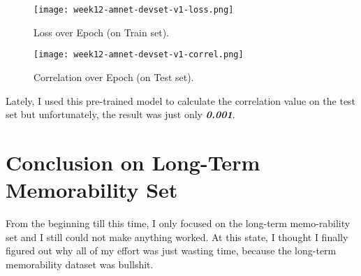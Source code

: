 \begin{figure}[!ht]
\centering
\texttt{[image: week12-amnet-devset-v1-loss.png]}
\caption{Loss over Epoch (on Train set).}
\end{figure}

\newpage
\begin{figure}[!ht]
\centering
\texttt{[image: week12-amnet-devset-v1-correl.png]}
\caption{Correlation over Epoch (on Test set).}
\end{figure}

Lately, I used this pre-trained model to calculate the correlation value on the test set but unfortunately, the result was just only \textbf{\emph{0.001}}.


\section{Conclusion on Long-Term Memorability Set}
From the beginning till this time, I only focused on the long-term memo-rability set and I still could not make anything worked. At this state, I thought I finally figured out why all of my effort was just wasting time, because the long-term memorability dataset was bullshit.













